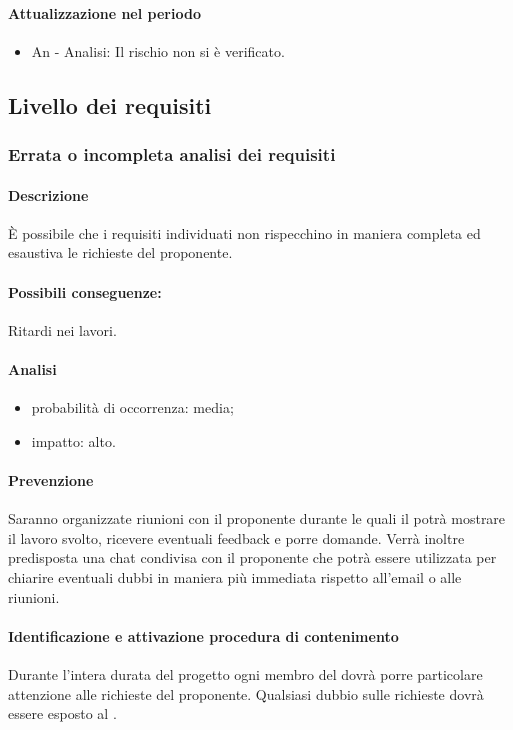 			\paragraph{Attualizzazione nel periodo}
				\begin{itemize}
				\item{An - Analisi}: Il rischio non si è verificato.
				\end{itemize}

	\subsection {Livello dei requisiti}
		\subsubsection {Errata o incompleta analisi dei requisiti}
			\label{subsec:erratiRequisiti}
			\paragraph{Descrizione} È possibile che i requisiti individuati non rispecchino in maniera completa ed esaustiva le richieste del proponente.
			\paragraph{Possibili conseguenze:} Ritardi nei lavori.
			\paragraph{Analisi}
			\begin{itemize}
			\item{probabilità di occorrenza:} media;
			\item{impatto:} alto.
			\end{itemize}
			\paragraph{Prevenzione} Saranno organizzate riunioni con il proponente durante le quali il  potrà mostrare il lavoro svolto, ricevere eventuali feedback e porre domande. Verrà inoltre predisposta una chat condivisa con il proponente che potrà essere utilizzata per chiarire eventuali dubbi in maniera più immediata rispetto all'email o alle riunioni.
			\paragraph{Identificazione e attivazione procedura di contenimento}
			Durante l'intera durata del progetto ogni membro del  dovrà porre particolare attenzione alle richieste del proponente. Qualsiasi dubbio sulle richieste dovrà essere esposto al \responsabilediprogetto.
